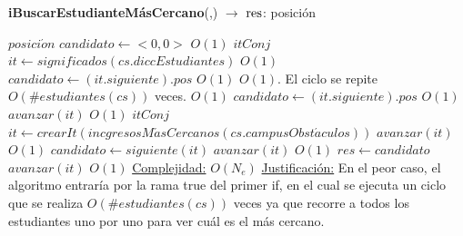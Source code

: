 \begin{Algoritmos}
\begin{algorithm}[H]{\textbf{iBuscarEstudianteM\'asCercano}(,) $\to$ $\res$: posici\'on}
	\begin{algorithmic}
        \State $posici\acute{o}n$ $candidato \gets <0,0>$
        	\Comment $O(1)$
        	\State $itConj$ $it \gets significados(cs.diccEstudiantes)$ \Comment $O(1)$
            \State $candidato \gets (it.siguiente).pos$ \Comment $O(1)$
             \Comment $O(1)$. El ciclo se repite $O(\#estudiantes(cs))$ veces.
            		\Comment $O(1)$
                	\State $candidato \gets (it.siguiente).pos$ \Comment $O(1)$
                \EndIf
                \State $avanzar(it)$ \Comment $O(1)$
            \EndWhile
        \Else
        	\State $itConj$ $it \gets crearIt(incgresosM\acute{a}sCercanos(cs.campusObst\acute{a}culos))$ $avanzar(it)$ \Comment $O(1)$
            \State $candidato \gets siguiente(it)$ $avanzar(it)$ \Comment $O(1)$
        \EndIf
        \State $res \gets candidato$ $avanzar(it)$ \Comment $O(1)$
        \medskip
		\Statex \underline{Complejidad:} $O(N_{e})$
		\Statex \underline{Justificaci\'on:} En el peor caso, el algoritmo entrar\'ia por la rama true del primer if, en el cual se ejecuta un ciclo que se realiza $O(\#estudiantes(cs))$ veces ya que recorre a todos los estudiantes uno por uno para ver cu\'al es el m\'as cercano.
	\end{algorithmic}
\end{algorithm}


\end{Algoritmos}
